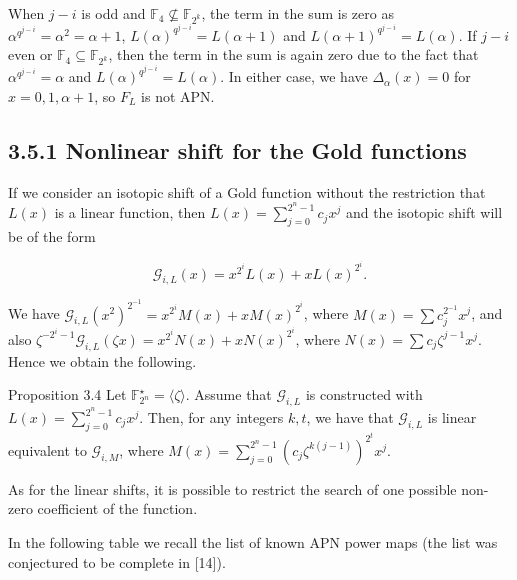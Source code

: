 \documentclass[10pt]{article}
\begin{document}
When $j-i$ is odd and $\mathbb{F}_{4} \nsubseteq \mathbb{F}_{2^{k}}$, the term in the sum is zero as $\alpha^{q^{j-i}}=\alpha^{2}=\alpha+1$, $L(\alpha)^{q^{j-i}}=L(\alpha+1)$ and $L(\alpha+1)^{q^{j-i}}=L(\alpha)$. If $j-i$ even or $\mathbb{F}_{4} \subseteq \mathbb{F}_{2^{k}}$, then the term in the sum is again zero due to the fact that $\alpha^{q^{j-i}}=\alpha$ and $L(\alpha)^{q^{j-i}}=L(\alpha)$. In either case, we have $\Delta_{\alpha}(x)=0$ for $x=0,1, \alpha+1$, so $F_{L}$ is not APN.

\subsection*{3.5.1 Nonlinear shift for the Gold functions}
If we consider an isotopic shift of a Gold function without the restriction that $L(x)$ is a linear function, then $L(x)=\sum_{j=0}^{2^{n}-1} c_{j} x^{j}$ and the isotopic shift will be of the form


\begin{equation*}
\mathscr{G}_{i, L}(x)=x^{2^{i}} L(x)+x L(x)^{2^{i}} . \tag{4}
\end{equation*}


We have $\mathscr{G}_{i, L}\left(x^{2}\right)^{2^{-1}}=x^{2^{i}} M(x)+x M(x)^{2^{i}}$, where $M(x)=\sum c_{j}^{2^{-1}} x^{j}$, and also $\zeta^{-2^{i}-1} \mathscr{G}_{i, L}(\zeta x)= x^{2^{i}} N(x)+x N(x)^{2^{i}}$, where $N(x)=\sum c_{j} \zeta^{j-1} x^{j}$. Hence we obtain the following.

Proposition 3.4 Let $\mathbb{F}_{2^{n}}^{\star}=\langle\zeta\rangle$. Assume that $\mathscr{G}_{i, L}$ is constructed with $L(x)=\sum_{j=0}^{2^{n}-1} c_{j} x^{j}$. Then, for any integers $k, t$, we have that $\mathscr{G}_{i, L}$ is linear equivalent to $\mathscr{G}_{i, M}$, where $M(x)=\sum_{j=0}^{2^{n}-1}\left(c_{j} \zeta^{k(j-1)}\right)^{2^{t}} x^{j}$.

As for the linear shifts, it is possible to restrict the search of one possible non-zero coefficient of the function.

In the following table we recall the list of known APN power maps (the list was conjectured to be complete in [14]).
\end{document}
